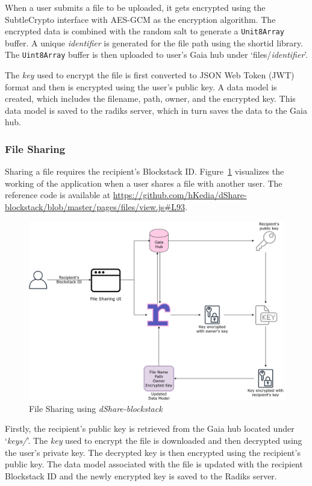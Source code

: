 When a user submits a file to be uploaded, it gets encrypted using the SubtleCrypto interface with AES-GCM as the encryption algorithm. The encrypted data is combined with the random salt to generate a \texttt{Unit8Array} buffer. A unique \textit{identifier} is generated for the file path using the shortid\cite{github:shortid:1} library. The \texttt{Uint8Array} buffer is then uploaded to user's Gaia hub under `files/{\textit{identifier}}'.

The \textit{key} used to encrypt the file is first converted to JSON Web Token (JWT) \cite{rfc7519} format and then is encrypted using the user's public key. A data model is created, which includes the filename, path, owner, and the encrypted key. This data model is saved to the radiks server, which in turn saves the data to the Gaia hub.

\subsubsection{File Sharing}
Sharing a file requires the recipient's Blockstack ID. Figure~\ref{fig:blockstack-share} visualizes the working of the application when a user shares a file with another user. The reference code is available at \url{https://github.com/hKedia/dShare-blockstack/blob/master/pages/files/view.js#L93}.

\begin{figure}[h]
	\includegraphics[width=\linewidth]{figures/blockstack-share}
	\caption{\label{fig:blockstack-share} File Sharing using \textit{dShare-blockstack}}
\end{figure}

Firstly, the recipient's public key is retrieved from the Gaia hub located under `\textit{keys/}'. The \textit{key} used to encrypt the file is downloaded and then decrypted using the user's private key. The decrypted key is then encrypted using the recipient's public key. The data model associated with the file is updated with the recipient Blockstack ID and the newly encrypted key is saved to the Radiks server. 

